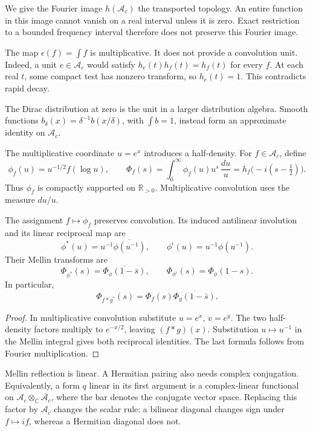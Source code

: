 We give the Fourier image \(h(\mathscr A_c)\) the transported topology.
An entire function in this image cannot vanish on a real interval unless
it is zero. Exact restriction to a bounded frequency interval therefore
does not preserve this Fourier image.

The map \(\epsilon(f)=\int f\) is multiplicative. It does not provide a
convolution unit. Indeed, a unit \(e\in\mathscr A_c\) would satisfy
\(h_e(t)h_f(t)=h_f(t)\) for every \(f\). At each real \(t\), some compact
test has nonzero transform, so \(h_e(t)=1\). This contradicts rapid decay.

The Dirac distribution at zero is the unit in a larger distribution
algebra. Smooth functions \(b_\delta(x)=\delta^{-1}b(x/\delta)\), with
\(\int b=1\), instead form an approximate identity on \(\mathscr A_c\).

The multiplicative coordinate \(u=e^x\) introduces a half-density.
For \(f\in\mathscr A_c\), define
\begin{equation}
 \phi_f(u)=u^{-1/2}f(\log u),\qquad
 \Phi_f(s)=\int_0^\infty\phi_f(u)u^s\,\frac{du}{u}
          =h_f\bigl(-i(s-\tfrac12)\bigr).
 \label{v4-arith:weil:eq:mellin}
\end{equation}
Thus \(\phi_f\) is compactly supported on \(\mathbb R_{>0}\).
Multiplicative convolution uses the measure \(du/u\).

\begin{proposition}
\label{v4-arith:weil:prop:reciprocal}
The assignment \(f\mapsto\phi_f\) preserves convolution. Its induced
antilinear involution and its linear reciprocal map are
\begin{equation}
 \phi^*(u)=u^{-1}\overline{\phi(u^{-1})},\qquad
 \phi^\iota(u)=u^{-1}\phi(u^{-1}).
 \label{v4-arith:weil:eq:reciprocal}
\end{equation}
Their Mellin transforms are
\[
 \Phi_{\phi^*}(s)=\overline{\Phi_\phi(1-\bar s)},\qquad
 \Phi_{\phi^\iota}(s)=\Phi_\phi(1-s).
\]
In particular,
\[
 \Phi_{f*g^*}(s)=
       \Phi_f(s)\overline{\Phi_g(1-\bar s)}.
\]
\end{proposition}
\begin{proof}
In multiplicative convolution substitute \(u=e^x\), \(v=e^y\).
The two half-density factors multiply to \(e^{-x/2}\), leaving
\((f*g)(x)\). Substitution \(u\mapsto u^{-1}\) in the Mellin integral
gives both reciprocal identities. The last formula follows from
Fourier multiplication.
\end{proof}

Mellin reflection is linear. A Hermitian pairing also needs complex
conjugation. Equivalently, a form \(q\) linear in its first argument is a
complex-linear functional on \(\mathscr A_c\otimes_{\mathbb C}
\overline{\mathscr A_c}\), where the bar denotes the conjugate vector
space. Replacing this factor by \(\mathscr A_c\) changes the scalar rule:
a bilinear diagonal changes sign under \(f\mapsto if\), whereas a Hermitian
diagonal does not.

